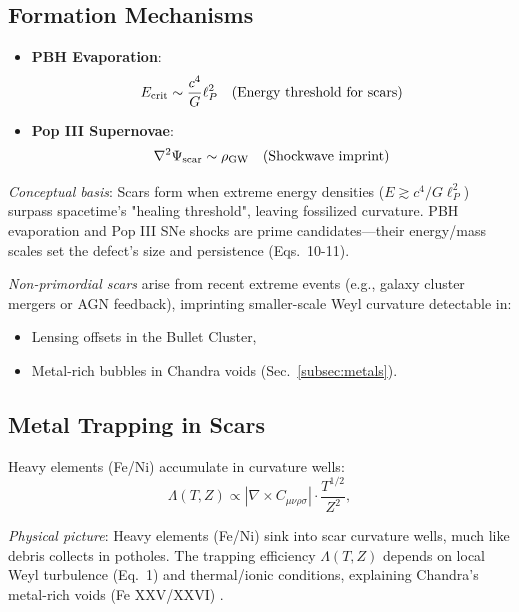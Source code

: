 \documentclass{article}
\begin{document}
\subsection{Formation Mechanisms}
\FloatBarrier
\begin{itemize}
    \item \textbf{PBH Evaporation}: 
        \begin{equation}
        E_{\rm crit} \sim \frac{c^4}{G} \ell_P^2 \quad (\text{Energy threshold for scars})
        \end{equation}
    \item \textbf{Pop III Supernovae}:
        \begin{equation}
        \nabla^2 \Psi_{\rm scar} \sim \rho_{\rm GW} \quad (\text{Shockwave imprint})
        \end{equation}
\end{itemize}

\textit{Conceptual basis}: Scars form when extreme energy densities ($E \gtrsim c^4/G\ell_P^2$) surpass spacetime's "healing threshold", leaving fossilized curvature. PBH evaporation and Pop III SNe shocks are prime candidates—their energy/mass scales set the defect's size and persistence (Eqs.~10-11). \\ \par

\textit{Non-primordial scars} arise from recent extreme events (e.g., galaxy cluster mergers or AGN feedback), imprinting smaller-scale Weyl curvature detectable in:  
\begin{itemize}  
    \item Lensing offsets in the Bullet Cluster,  
    \item Metal-rich bubbles in Chandra voids (Sec.~\ref{subsec:metals}).  
\end{itemize}  


\subsection{Metal Trapping in Scars}
Heavy elements (Fe/Ni) accumulate in curvature wells:
\begin{equation}\label{eq:metal_trapping} 
    \Lambda(T,Z) \propto \left| \nabla \times C_{\mu\nu\rho\sigma} \right| \cdot \frac{T^{1/2}}{Z^2},
\end{equation}

\textit{Physical picture}: Heavy elements (Fe/Ni) sink into scar curvature wells, much like debris collects in potholes. The trapping efficiency $\Lambda(T,Z)$ depends on local Weyl turbulence (Eq.~1) and thermal/ionic conditions, explaining Chandra's metal-rich voids (Fe XXV/XXVI) \cite{Simionescu2023}.  
\end{document}
